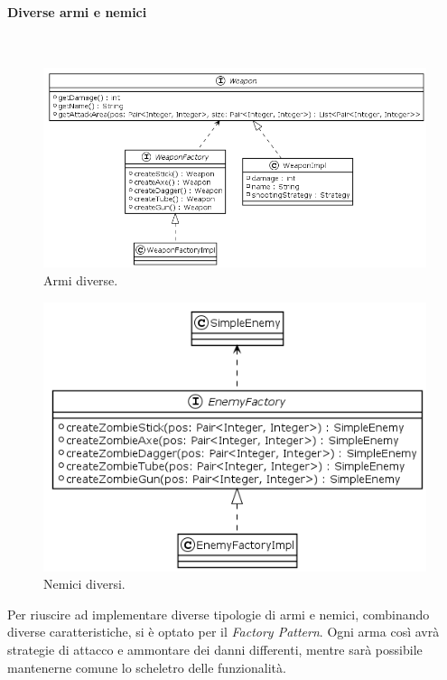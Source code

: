 \documentclass[a4paper,titlepage,12pt]{article}
\begin{document}
\paragraph{Diverse armi e nemici}
\par \noindent \\
\begin{figure}[H]
    \centering
    \includegraphics[scale=0.55]{img/uml/Weapon.png}
    \caption{Armi diverse.}
    \label{fig: Weapon}
\end{figure}
\begin{figure}[H]
    \centering
    \includegraphics[scale=0.7]{img/uml/Enemy.png}
    \caption{Nemici diversi.}
    \label{fig: Enemy}
\end{figure}
\par \noindent Per riuscire ad implementare diverse tipologie di armi e nemici, combinando diverse caratteristiche, si è optato per il \textit{Factory Pattern}. Ogni arma così avrà strategie di attacco e ammontare dei danni differenti, mentre sarà possibile mantenerne comune lo scheletro delle funzionalità.
\end{document}
